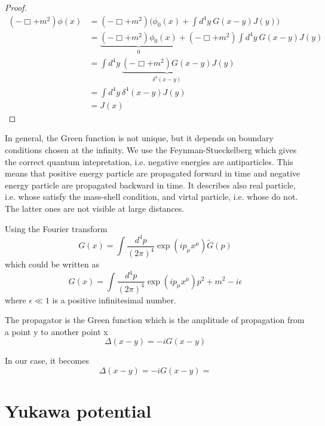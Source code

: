     \begin{proof}
        \begin{equation*}
        \begin{aligned}
            (- \Box + m^2) \phi(x) & =  (- \Box + m^2) \Big (\phi_0 (x) + \int d^4y ~ G(x-y) J (y) \Big ) \\ & = \underbrace{(- \Box + m^2) \phi_0 (x)}_0 + (- \Box + m^2) \int d^4y ~ G(x-y) J (y) \\ & =  \int d^4y ~ \underbrace{(- \Box + m^2) G(x-y)}_{\delta^4(x-y)} J (y) \\ & = \int d^4 y ~ \delta^4(x-y) J(y) \\ & = J(x)
        \end{aligned}
        \end{equation*}
    \end{proof}

    In general, the Green function is not unique, but it depends on boundary conditions chosen at the infinity. We use the Feynman-Stueckelberg which gives the correct quantum intepretation, i.e. negative energies are antiparticles. This means that positive energy particle are propagated forward in time and negative energy particle are propagated backward in time. It describes also real particle, i.e. whose satisfy the mass-shell condition, and virtal particle, i.e. whose do not. The latter ones are not visible at large distances.  

    Using the Fourier transform 
    \begin{equation*}
        G(x) = \int \frac{d^4 p}{(2\pi)^4} \exp(i p_\mu x^\mu) \tilde G(p)
    \end{equation*}
    which could be written as 
    \begin{equation*}
        G(x) = \int \frac{d^4 p}{(2\pi)^4} {\exp(i p_\mu x^\mu)}{p^2 + m^2 - i \epsilon}
    \end{equation*}
    where $\epsilon \ll 1$ is a positive infinitesimal number.

    The propagator is the Green function which is the amplitude of propagation from a point y to another point x
    \begin{equation*}
        \Delta (x - y) = - i G(x - y)
    \end{equation*}

    In our case, it becomes 
    \begin{equation}
        \Delta (x - y) = - i G(x - y) = 
    \end{equation}

\section{Yukawa potential}
    
